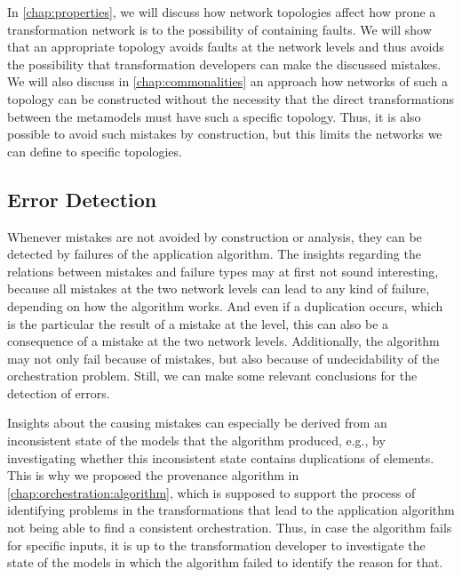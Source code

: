 
In \autoref{chap:properties}, we will discuss how network topologies affect how prone a transformation network is to the possibility of containing faults.
We will show that an appropriate topology avoids faults at the network levels and thus avoids the possibility that transformation developers can make the discussed mistakes.
We will also discuss in \autoref{chap:commonalities} an approach how networks of such a topology can be constructed without the necessity that the direct transformations between the metamodels must have such a specific topology.
Thus, it is also possible to avoid such mistakes by construction, but this limits the networks we can define to specific topologies.



\subsection{Error Detection}

Whenever mistakes are not avoided by construction or analysis, they can be detected by failures of the application algorithm.
The insights regarding the relations between mistakes and failure types may at first not sound interesting, because all mistakes at the two network levels can lead to any kind of failure, depending on how the algorithm works.
And even if a duplication occurs, which is the particular the result of a mistake at the \leveltransformation level, this can also be a consequence of a mistake at the two network levels.
Additionally, the algorithm may not only fail because of mistakes, but also because of undecidability of the orchestration problem.
Still, we can make some relevant conclusions for the detection of errors.

Insights about the causing mistakes can especially be derived from an inconsistent state of the models that the algorithm produced, e.g., by investigating whether this inconsistent state contains duplications of elements.
This is why we proposed the provenance algorithm in \autoref{chap:orchestration:algorithm}, which is supposed to support the process of identifying problems in the transformations that lead to the application algorithm not being able to find a consistent orchestration.
Thus, in case the algorithm fails for specific inputs, it is up to the transformation developer to investigate the state of the models in which the algorithm failed to identify the reason for that.

